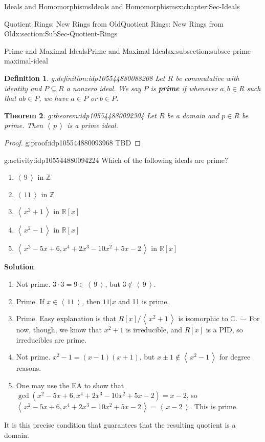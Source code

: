 \documentclass[oneside,10pt,]{book}
\newcommand{\blocktitlefont}{\relax}
\newcommand{\terminology}[1]{\textbf{#1}}
\numberwithin{equation}{section}
\newcommand{\ideal}[1]{\left\langle\, #1 \,\right\rangle}
\def\C{{\mathbb C}}
\def\Z{{\mathbb Z}}
\def\R{{\mathbb R}}
\newtheorem{theorem}{Theorem}[section]
\newtheorem{definition}[theorem]{Definition}
\begin{document}
\begin{chapterptx}{Ideals and Homomorphisms}{}{Ideals and Homomorphisms}{}{}{x:chapter:Sec-Ideals}
\begin{sectionptx}{Quotient Rings: New Rings from Old}{}{Quotient Rings: New Rings from Old}{}{}{x:section:SubSec-Quotient-Rings}
\begin{subsectionptx}{Prime and Maximal Ideals}{}{Prime and Maximal Ideals}{}{}{x:subsection:subsec-prime-maximal-ideal}
\begin{definition}{}{g:definition:idp105544880088208}%
%
%
Let \(R\) be commutative with identity and \(P\subsetneq R\) a nonzero ideal. We say \(P\) is \terminology{prime} if whenever \(a,b\in R\) such that \(ab\in P\), we have \(a\in P\) or \(b\in P\).%
\end{definition}
\begin{theorem}{}{}{g:theorem:idp105544880092304}%
Let \(R\) be a domain and \(p\in R\) be prime. Then \(\ideal{p}\) is a prime ideal.%
\end{theorem}
\begin{proof}{}{g:proof:idp105544880093968}
TBD\end{proof}
\begin{activity}{}{g:activity:idp105544880094224}%
Which of the following ideals are prime?%
\begin{enumerate}
\item{}\(\ideal{9}\) in \(\Z\)%
\item{}\(\ideal{11}\) in \(\Z\)%
\item{}\(\ideal{x^2+1}\) in \(\R[x]\)%
\item{}\(\ideal{x^2-1}\) in \(\R[x]\)%
\item{}\(\ideal{x^2-5x+6, x^4+2x^3-10x^2+5x-2}\) in \(\R[x]\)%
\end{enumerate}
%
\par\smallskip%
\noindent\textbf{\blocktitlefont Solution}.\hypertarget{g:solution:idp105544880102288}{}\quad{}%
\begin{enumerate}
\item{}Not prime. \(3\cdot 3= 9\in \ideal{9}\), but \(3\notin\ideal{9}\).%
\item{}Prime. If \(x\in \ideal{11}\), then \(11|x\) and 11 is prime.%
\item{}Prime. Easy explanation is that \(R[x]/\ideal{x^2+1}\) is isomorphic to \(\C\). \(\ddot\smile\) For now, though, we know that \(x^2+1\) is irreducible, and \(R[x]\) is a PID, so irreducibles are prime.%
\item{}Not prime. \(x^2-1 = (x-1)(x+1)\), but \(x\pm 1\notin \ideal{x^2-1}\) for degree reasons.%
\item{}One may use the EA to show that \(\gcd(x^2-5x+6,x^4+2x^3-10x^2+5x-2) = x-2\), so \(\ideal{x^2-5x+6, x^4+2x^3-10x^2+5x-2} = \ideal{x-2}\). This is prime.%
\end{enumerate}
%
\end{activity}%
It is this precise condition that guarantees that the resulting quotient is a domain.%

\end{subsectionptx}
\end{sectionptx}
\end{chapterptx}
\end{document}
